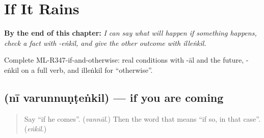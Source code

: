 
\chapter{If It Rains}
\label{ch:ml-if-it-rains}

\begin{chapteropening}
\textbf{By the end of this chapter:} \emph{I can say what will happen if something happens, check a fact with -eṅkil, and give the other outcome with illeṅkil.}

Complete ML-R347-if-and-otherwise: real conditions with -āl and the future, -eṅkil on a full verb, and illeṅkil for \textquotedblleft{}otherwise\textquotedblright{}.
\end{chapteropening}

\section[\texorpdfstring{\ml{നീ} \ml{വരുന്നുണ്ടെങ്കിൽ} (nī varunnuṇṭeṅkil)}{നീ വരുന്നുണ്ടെങ്കിൽ (nī varunnuṇṭeṅkil)}]{  (nī varunnuṇṭeṅkil) — if you are coming}

\label{lesson:ML-C347-varunnundenkil}



\begin{quote}
Say \textquotedblleft{}if he comes\textquotedblright{}. (\emph{vannāl}.) Then the word that means \textquotedblleft{}if so, in that case\textquotedblright{}. (\emph{eṅkil}.)
\end{quote}

